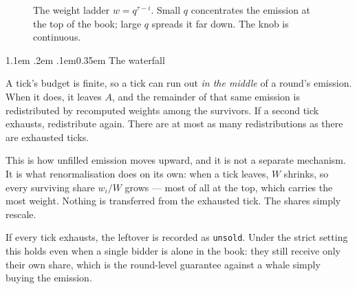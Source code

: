 \documentclass[11pt]{article}
\makeatletter
\renewcommand\subsection{\@startsection{subsection}{2}{\z@}%
  {1.1em \@plus .2em \@minus .1em}{0.35em}%
  {\sffamily\normalsize\bfseries\color{ink}}}
\makeatother
\begin{document}
\begin{figure}[h]
\centering
{}
\caption{The weight ladder $w=q^{\tau-i}$. Small $q$ concentrates the emission at the top of
the book; large $q$ spreads it far down. The knob is continuous.}
\end{figure}

\subsection{The waterfall}

A tick's budget is finite, so a tick can run out \emph{in the middle} of a round's emission.
When it does, it leaves $A$, and the remainder of that same emission is redistributed by
recomputed weights among the survivors. If a second tick exhausts, redistribute again. There
are at most as many redistributions as there are exhausted ticks.

This is how unfilled emission moves upward, and it is not a separate mechanism. It is what
renormalisation does on its own: when a tick leaves, $W$ shrinks, so every surviving share
$w_i/W$ grows — most of all at the top, which carries the most weight. Nothing is transferred
from the exhausted tick. The shares simply rescale.

If every tick exhausts, the leftover is recorded as \texttt{unsold}. Under the strict setting
this holds even when a single bidder is alone in the book: they still receive only their own
share, which is the round-level guarantee against a whale simply buying the emission.
\end{document}
